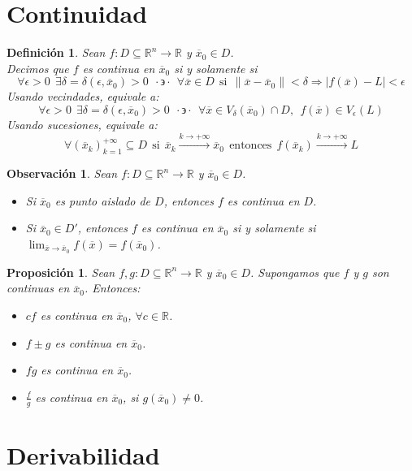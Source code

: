 \documentclass[11pt]{report}
\newtheorem{definition}{Definición}[section]
\newtheorem{observation}{Observación}[section]
\newtheorem{proposition}{Proposición}[section]
\newcommand{\Rn}{\mathbb{R}^{n}}
\newcommand{\R}{\mathbb{R}}
\newcommand{\x}{\overline{x}}
\newcommand{\xz}{\overline{x}_{0}}
\newcommand{\tq}{\cdot\backepsilon\cdot}
\begin{document}
\section{Continuidad}

\begin{definition} Sean $f:D\subseteq\Rn\rightarrow\R$ y $\xz\in D$.\\
Decimos que $f$ es continua en $\xz$ si y solamente si
$$\forall\epsilon>0\ \ \exists\delta=\delta(\epsilon, \xz)>0\ \ \tq\ \ \forall\x\in D\ \ \text{si}\ \ \| \x-\xz \|<\delta\Rightarrow|f(\x)-L|<\epsilon$$
Usando vecindades, equivale a:
$$\forall\epsilon>0\ \ \exists\delta=\delta(\epsilon, \xz)>0\ \ \tq\ \ \forall\x\in V_{\delta}(\xz)\cap D,\ \ f(\x)\in V_{\epsilon}(L)$$
Usando sucesiones, equivale a:
$$\forall(\x_{k})_{k=1}^{+\infty}\subseteq D\ \ \text{si}\ \ \x_{k}\xrightarrow{k\rightarrow+\infty}\xz\ \ \text{entonces}\ \ f(\x_{k})\xrightarrow{k\rightarrow+\infty}L$$
\end{definition}

\begin{observation} Sean $f:D\subseteq\Rn\rightarrow\R$ y $\xz\in D$.
\begin{itemize}
\item[(i)] Si $\xz$ es punto aislado de $D$, entonces $f$ es continua en $D$.
\item[(ii)] Si $\xz\in D'$, entonces $f$ es continua en $\xz$ si y solamente si $\lim_{\x\to\xz}f(\x)=f(\xz)$.
\end{itemize}
\end{observation}

\begin{proposition}
Sean $f, g:D\subseteq\Rn\rightarrow\R$ y $\xz\in D$. Supongamos que $f$ y $g$ son continuas en $\xz$. Entonces:
\begin{itemize}
\item[(i)] $cf$ es continua en $\xz$, $\forall c\in\R$.
\item[(ii)] $f\pm g$ es continua en $\xz$.
\item[(iii)] $fg$ es continua en $\xz$.
\item[(iv)] $\frac{f}{g}$ es continua en $\xz$, si $g(\xz)\ne0$.
\end{itemize}
\end{proposition}

\section{Derivabilidad}
\end{document}
